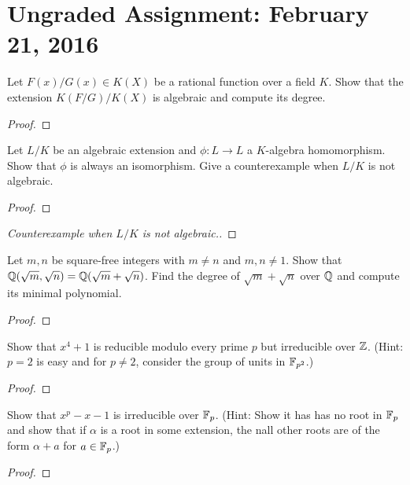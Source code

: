 \section[Assignment 1]{Ungraded Assignment: February 21, 2016}

\begin{que} %
Let $F(x)/G(x) \in K(X)$ be a rational function over a field $K$. Show that the extension $K(F/G)/K(X)$ is algebraic and compute its degree.
\end{que}
\begin{proof}

\end{proof}

\begin{que} %
Let $L/K$ be an algebraic extension and $\phi: L \to L$ a $K$-algebra homomorphism. Show that $\phi$ is always an isomorphism. Give a counterexample when $L/K$ is not algebraic.
\end{que}
\begin{proof}

\end{proof}
\begin{proof}[Counterexample when $L/K$ is not algebraic.]

\end{proof}

\begin{que} %
Let $m, n$ be square-free integers with $m \neq n$ and $m,n \neq 1$. Show that $\mathbb{Q}(\sqrt{m}, \sqrt{n}) = \mathbb{Q}(\sqrt{m} + \sqrt{n})$. Find the degree of $\sqrt{m} + \sqrt{n}$ over $\mathbb{Q}$ and compute its minimal polynomial.
\end{que}
\begin{proof}

\end{proof}

\begin{que} %
Show that $x^4 + 1$ is reducible modulo every prime $p$ but irreducible over $\mathbb{Z}$. (Hint: $p = 2$ is easy and for $p \neq 2$, consider the group of units in $\mathbb{F}_{p^2}$.)
\end{que}
\begin{proof}

\end{proof}

\begin{que} %
Show that $x^p - x - 1$ is irreducible over $\mathbb{F}_p$. (Hint: Show it has has no root in $\mathbb{F}_p$ and show that if $\alpha$ is a root in some extension, the nall other roots are of the form $\alpha + a$ for $a \in \mathbb{F}_p$.)
\end{que}
\begin{proof}

\end{proof}

